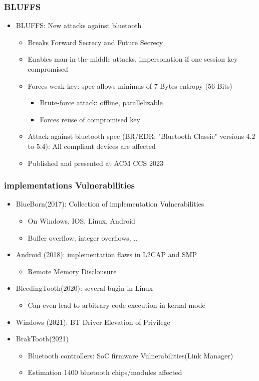 \subsubsection{BLUFFS}
\begin{itemize}
  \item BLUFFS: New attacks against bluetooth
    \begin{itemize}
      \item Breaks Forward Secrecy and Future Secrecy
      \item Enables man-in-the-middle attacks, impersonation if one session key compromised 
      \item Forces weak key: spec allows minimus of 7 Bytes entropy (56 Bits) 
        \begin{itemize}
          \item Brute-force attack: offline, parallelizable
          \item Forces reuse of compromised key 
        \end{itemize}
      \item Attack against bluetooth spec (BR/EDR: "Bluetooth Classic" versions 4.2 to 5.4): All compliant devices are affected 
      \item Published and presented at ACM CCS 2023 
    \end{itemize}
\end{itemize}

\subsubsection{implementations Vulnerabilities}
\begin{itemize}
  \item BlueBorn(2017): Collection of implementation Vulnerabilities
    \begin{itemize}
      \item On Windows, IOS, Linux, Android
      \item Buffer overflow, integer overflows, .. 
    \end{itemize}
  \item Android (2018): implementation flaws in L2CAP and SMP 
    \begin{itemize}
      \item Remote Memory Disclousure
    \end{itemize}
  \item BleedingTooth(2020): several bugin in Linux 
    \begin{itemize}
      \item Can even lead to arbitrary code execution in kernal mode
    \end{itemize}
  \item Windows (2021): BT Driver Elevation of Privilege 
  \item BrakTooth(2021) 
    \begin{itemize}
      \item Bluetooth controllers: SoC firmware Vulnerabilities(Link Manager)
      \item Estimation 1400 bluetooth chips/modules affected 
    \end{itemize}
\end{itemize}


